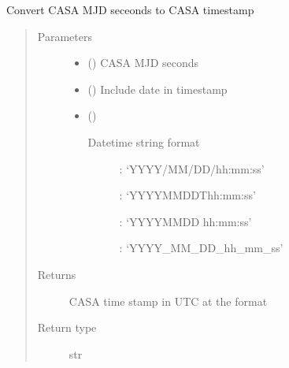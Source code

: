 \documentclass[letterpaper,10pt,english]{sphinxmanual}
\begin{document}
\begin{fulllineitems}
\label{\detokenize{paircars:paircars.basic_func.mjdsec_to_timestamp}}
\sphinxAtStartPar
Convert CASA MJD seceonds to CASA timestamp
\begin{quote}\begin{description}
\item[{Parameters}] \leavevmode\begin{itemize}
\item {} 
\sphinxAtStartPar
{} () \textendash{} CASA MJD seconds

\item {} 
\sphinxAtStartPar
{} () \textendash{} Include date in timestamp

\item {} 
\sphinxAtStartPar
{} () \textendash{} \begin{description}
\item[{Datetime string format}] \leavevmode
{}: ‘YYYY/MM/DD/hh:mm:ss’

: ‘YYYY\sphinxhyphen{}MM\sphinxhyphen{}DDThh:mm:ss’

: ‘YYYY\sphinxhyphen{}MM\sphinxhyphen{}DD hh:mm:ss’

: ‘YYYY\_MM\_DD\_hh\_mm\_ss’

\end{description}


\end{itemize}

\item[{Returns}] \leavevmode
\sphinxAtStartPar
CASA time stamp in UTC at the format

\item[{Return type}] \leavevmode
\sphinxAtStartPar
str

\end{description}\end{quote}

\end{fulllineitems}
\end{document}

